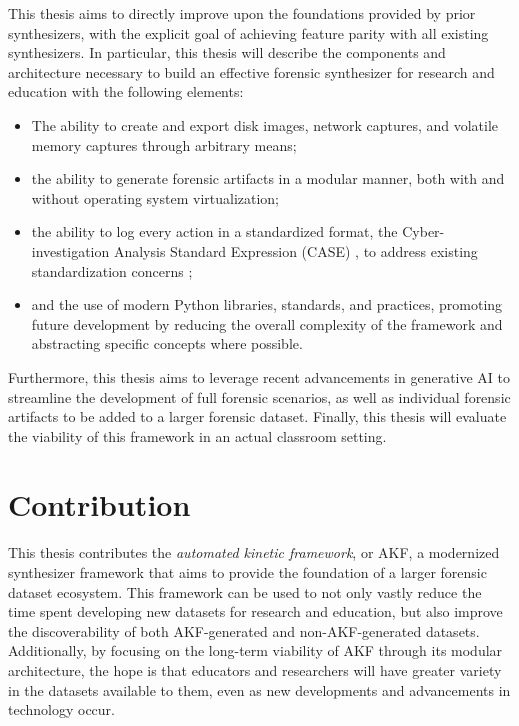 \documentclass[letterpaper,12pt]{report}
\def\tightlist{}
\begin{document}
This thesis aims to directly improve upon the foundations provided by
prior synthesizers, with the explicit goal of achieving feature parity
with all existing synthesizers. In particular, this thesis will describe
the components and architecture necessary to build an effective forensic
synthesizer for research and education with the following elements:

\begin{itemize}
\tightlist
\item
  The ability to create and export disk images, network captures, and
  volatile memory captures through arbitrary means;
\item
  the ability to generate forensic artifacts in a modular manner, both
  with and without operating system virtualization;
\item
  the ability to log every action in a standardized format, the
  Cyber-investigation Analysis Standard Expression (CASE)
  \cite{caseyAdvancingCoordinatedCyberinvestigations2017}, to
  address existing standardization concerns
  \cite{horsmanDatasetConstructionChallenges2021};
\item
  and the use of modern Python libraries, standards, and practices,
  promoting future development by reducing the overall complexity of the
  framework and abstracting specific concepts where possible.
\end{itemize}

Furthermore, this thesis aims to leverage recent advancements in
generative AI to streamline the development of full forensic scenarios,
as well as individual forensic artifacts to be added to a larger
forensic dataset. Finally, this thesis will evaluate the viability of
this framework in an actual classroom setting.

\section{Contribution}\label{contribution}

This thesis contributes the \emph{automated kinetic framework}, or AKF,
a modernized synthesizer framework that aims to provide the foundation
of a larger forensic dataset ecosystem. This framework can be used to
not only vastly reduce the time spent developing new datasets for
research and education, but also improve the discoverability of both
AKF-generated and non-AKF-generated datasets. Additionally, by focusing
on the long-term viability of AKF through its modular architecture, the
hope is that educators and researchers will have greater variety in the
datasets available to them, even as new developments and advancements in
technology occur.
\end{document}

